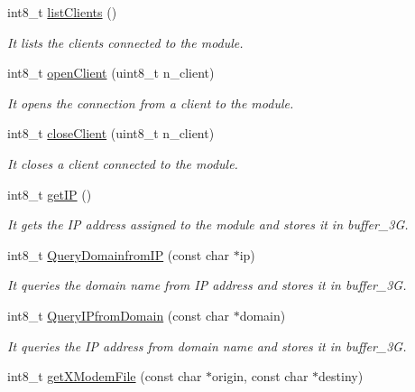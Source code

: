 \begin{DoxyCompactItemize}
int8\+\_\+t \hyperlink{class_wasp3_g_a27ed8aee0904a28c4b49c8eaf73fcffe}{list\+Clients} ()
\begin{DoxyCompactList}\small\item\em It lists the clients connected to the module. \end{DoxyCompactList}\item 
int8\+\_\+t \hyperlink{class_wasp3_g_ac1713556a05dedb745ebaa19bdd34fa6}{open\+Client} (uint8\+\_\+t n\+\_\+client)
\begin{DoxyCompactList}\small\item\em It opens the connection from a client to the module. \end{DoxyCompactList}\item 
int8\+\_\+t \hyperlink{class_wasp3_g_a9491bd69d8d974b3bb42f58f70728890}{close\+Client} (uint8\+\_\+t n\+\_\+client)
\begin{DoxyCompactList}\small\item\em It closes a client connected to the module. \end{DoxyCompactList}\item 
int8\+\_\+t \hyperlink{class_wasp3_g_a23369d01ca33372b5f0b9a685931c4dd}{get\+IP} ()
\begin{DoxyCompactList}\small\item\em It gets the IP address assigned to the module and stores it in \textquotesingle{}buffer\+\_\+3G\textquotesingle{}. \end{DoxyCompactList}\item 
int8\+\_\+t \hyperlink{class_wasp3_g_a3612d3fb747cfad65a04d7682224acee}{Query\+Domainfrom\+IP} (const char $\ast$ip)
\begin{DoxyCompactList}\small\item\em It queries the domain name from IP address and stores it in \textquotesingle{}buffer\+\_\+3G\textquotesingle{}. \end{DoxyCompactList}\item 
int8\+\_\+t \hyperlink{class_wasp3_g_a72389f4eccf5df2681d06043418e0aa5}{Query\+I\+Pfrom\+Domain} (const char $\ast$domain)
\begin{DoxyCompactList}\small\item\em It queries the IP address from domain name and stores it in \textquotesingle{}buffer\+\_\+3G\textquotesingle{}. \end{DoxyCompactList}\item 
int8\+\_\+t \hyperlink{class_wasp3_g_a577233144caac3268742ccc4f12af971}{get\+X\+Modem\+File} (const char $\ast$origin, const char $\ast$destiny)

\end{DoxyCompactItemize}
